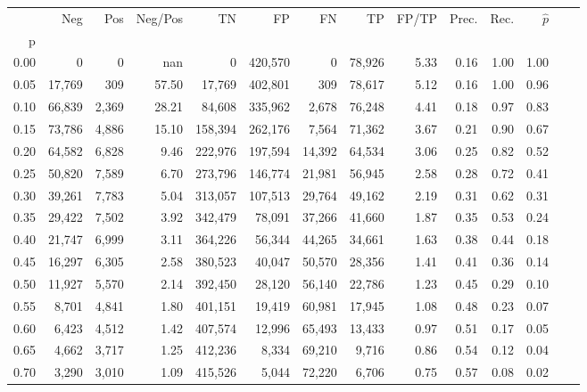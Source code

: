 \begin{tabular}{rrrrrrrrrrrrrr}
\toprule
{} &     Neg &    Pos & Neg/Pos &       TN &       FP &      FN &      TP & FP/TP & Prec. &  Rec. & $\hat{p}$ \\
p    &         &        &         &          &          &         &         &       &       &       &           \\
\midrule
0.00 &       0 &      0 &     nan &        0 &  420,570 &       0 &  78,926 &  5.33 &  0.16 &  1.00 &      1.00 \\
0.05 &  17,769 &    309 &   57.50 &   17,769 &  402,801 &     309 &  78,617 &  5.12 &  0.16 &  1.00 &      0.96 \\
0.10 &  66,839 &  2,369 &   28.21 &   84,608 &  335,962 &   2,678 &  76,248 &  4.41 &  0.18 &  0.97 &      0.83 \\
0.15 &  73,786 &  4,886 &   15.10 &  158,394 &  262,176 &   7,564 &  71,362 &  3.67 &  0.21 &  0.90 &      0.67 \\
0.20 &  64,582 &  6,828 &    9.46 &  222,976 &  197,594 &  14,392 &  64,534 &  3.06 &  0.25 &  0.82 &      0.52 \\
0.25 &  50,820 &  7,589 &    6.70 &  273,796 &  146,774 &  21,981 &  56,945 &  2.58 &  0.28 &  0.72 &      0.41 \\
0.30 &  39,261 &  7,783 &    5.04 &  313,057 &  107,513 &  29,764 &  49,162 &  2.19 &  0.31 &  0.62 &      0.31 \\
0.35 &  29,422 &  7,502 &    3.92 &  342,479 &   78,091 &  37,266 &  41,660 &  1.87 &  0.35 &  0.53 &      0.24 \\
0.40 &  21,747 &  6,999 &    3.11 &  364,226 &   56,344 &  44,265 &  34,661 &  1.63 &  0.38 &  0.44 &      0.18 \\
0.45 &  16,297 &  6,305 &    2.58 &  380,523 &   40,047 &  50,570 &  28,356 &  1.41 &  0.41 &  0.36 &      0.14 \\
0.50 &  11,927 &  5,570 &    2.14 &  392,450 &   28,120 &  56,140 &  22,786 &  1.23 &  0.45 &  0.29 &      0.10 \\
0.55 &   8,701 &  4,841 &    1.80 &  401,151 &   19,419 &  60,981 &  17,945 &  1.08 &  0.48 &  0.23 &      0.07 \\
0.60 &   6,423 &  4,512 &    1.42 &  407,574 &   12,996 &  65,493 &  13,433 &  0.97 &  0.51 &  0.17 &      0.05 \\
0.65 &   4,662 &  3,717 &    1.25 &  412,236 &    8,334 &  69,210 &   9,716 &  0.86 &  0.54 &  0.12 &      0.04 \\
0.70 &   3,290 &  3,010 &    1.09 &  415,526 &    5,044 &  72,220 &   6,706 &  0.75 &  0.57 &  0.08 &      0.02 \\

\end{tabular}
